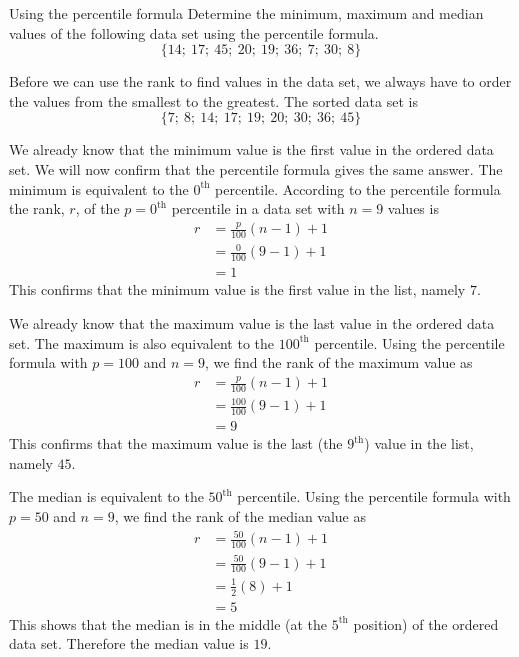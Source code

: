 \begin{wex}{Using the percentile formula}
{Determine the minimum, maximum and median values of the following
    data set using the percentile formula.
    \begin{equation*}
      \{14;\ 17;\ 45;\ 20;\ 19;\ 36;\ 7;\ 30;\ 8\}
    \end{equation*}
}{

    Before we can use the rank to find values in the data set, we
    always have to order the values from the smallest to the
    greatest. The sorted data set is
    \begin{equation*}
      \{7;\ 8;\ 14;\ 17;\ 19;\ 20;\ 30;\ 36;\ 45\}
    \end{equation*}


    We already know that the minimum value is the first value in the
    ordered data set. We will now confirm that the percentile formula
    gives the same answer. The minimum is equivalent to the $0^{\mathrm{th}}$
    percentile. According to the percentile formula the rank, $r$, of the
    $p = 0^{\mathrm{th}}$ percentile in a data set with $n=9$ values is
    \begin{align*}
      r &= \frac{p}{100}\left(n-1\right)+1 \\
        &= \frac{0}{100}\left(9-1\right)+1 \\
        &= 1
    \end{align*}
    This confirms that the minimum value is the first value in the
    list, namely $7$.


    We already know that the maximum value is the last value in the
    ordered data set. The maximum is also equivalent to the $100^{\mathrm{th}}$
    percentile. Using the percentile formula with $p=100$ and $n=9$,
    we find the rank of the maximum value as
    \begin{align*}
      r &= \frac{p}{100}\left(n-1\right)+1 \\
        &= \frac{100}{100}\left(9-1\right)+1 \\
        &= 9
    \end{align*}
    This confirms that the maximum value is the last (the $9^{\mathrm{th}}$) value
    in the list, namely $45$.


    The median is equivalent to the $50^{\mathrm{th}}$ percentile. Using the
    percentile formula with $p=50$ and $n=9$, we find the rank of the
    median value as
    \begin{align*}
      r &= \frac{50}{100}\left(n-1\right)+1 \\
        &= \frac{50}{100}\left(9-1\right)+1 \\
        &= \frac{1}{2}(8)+1 \\
        &= 5
    \end{align*}
    This shows that the median is in the middle (at the $5^{\mathrm{th}}$ position)
    of the ordered data set. Therefore the median value is $19$. 
}
\end{wex}

